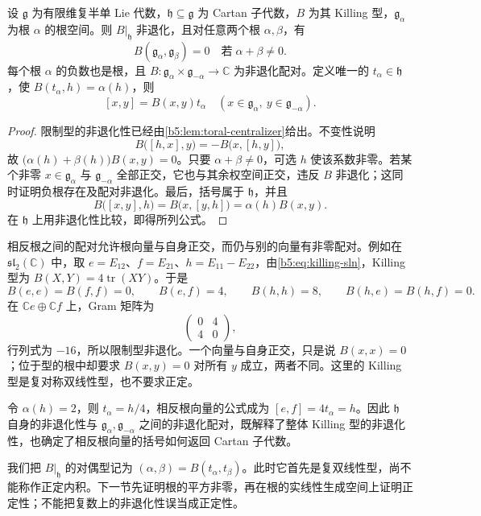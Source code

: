 \begin{proposition}\label{b5:prop:root-killing-pairing}
	设 \(\mathfrak g\) 为有限维复半单 Lie 代数，\(\mathfrak h\subseteq\mathfrak g\) 为 Cartan 子代数，\(B\) 为其 Killing 型，\(\mathfrak g_\alpha\) 为根 \(\alpha\) 的根空间。则 \(B|_{\mathfrak h}\) 非退化，且对任意两个根 \(\alpha,\beta\)，有
	\[
		B(\mathfrak g_\alpha,\mathfrak g_\beta)=0 \quad\text{若}\;\alpha+\beta\ne0.
	\]
	每个根 \(\alpha\) 的负数也是根，且 \(B:\mathfrak g_\alpha\times\mathfrak g_{-\alpha}\to\mathbb C\) 为非退化配对。定义唯一的 \(t_\alpha\in\mathfrak h\)，使 \(B(t_\alpha,h)=\alpha(h)\)，则
	\begin{equation}\label{b5:eq:opposite-root-bracket}
		[x,y]=B(x,y)t_\alpha \quad(x\in\mathfrak g_\alpha,\ y\in\mathfrak g_{-\alpha}).
	\end{equation}
\end{proposition}
\begin{proof}
	限制型的非退化性已经由\cref{b5:lem:toral-centralizer}给出。不变性说明
	\[
		B\bigl([h,x],y\bigr)=-B\bigl(x,[h,y]\bigr),
	\]
	故 \(\bigl(\alpha(h)+\beta(h)\bigr)B(x,y)=0\)。只要 \(\alpha+\beta\ne0\)，可选 \(h\) 使该系数非零。若某个非零 \(x\in\mathfrak g_\alpha\) 与 \(\mathfrak g_{-\alpha}\) 全部正交，它也与其余权空间正交，违反 \(B\) 非退化；这同时证明负根存在及配对非退化。最后，括号属于 \(\mathfrak h\)，并且
	\[
		B\bigl([x,y],h\bigr)=B\bigl(x,[y,h]\bigr) =\alpha(h)B(x,y).
	\]
	在 \(\mathfrak h\) 上用非退化性比较，即得所列公式。
\end{proof}

相反根之间的配对允许根向量与自身正交，而仍与别的向量有非零配对。例如在 \(\mathfrak{sl}_2(\mathbb C)\) 中，取 \(e=E_{12}\)、\(f=E_{21}\)、\(h=E_{11}-E_{22}\)，由\eqref{b5:eq:killing-sln}，Killing 型为 \(B(X,Y)=4\operatorname{tr}(XY)\)。于是
\[
	B(e,e)=B(f,f)=0,\qquad B(e,f)=4, \qquad B(h,h)=8,\qquad B(h,e)=B(h,f)=0.
\]
在 \(\mathbb Ce\oplus\mathbb Cf\) 上，Gram 矩阵为
\[
	\begin{pmatrix}0&4\\4&0\end{pmatrix},
\]
行列式为 \(-16\)，所以限制型非退化。一个向量与自身正交，只是说 \(B(x,x)=0\)；位于型的根中却要求 \(B(x,y)=0\) 对所有 \(y\) 成立，两者不同。这里的 Killing 型是复对称双线性型，也不要求正定。

\ProseParagraphBreak

令 \(\alpha(h)=2\)，则 \(t_\alpha=h/4\)，相反根向量的公式成为 \([e,f]=4t_\alpha=h\)。因此 \(\mathfrak h\) 自身的非退化性与 \(\mathfrak g_\alpha,\mathfrak g_{-\alpha}\) 之间的非退化配对，既解释了整体 Killing 型的非退化性，也确定了相反根向量的括号如何返回 Cartan 子代数。

\ProseParagraphBreak

我们把 \(B|_{\mathfrak h}\) 的对偶型记为 \((\alpha,\beta)=B(t_\alpha,t_\beta)\)。此时它首先是复双线性型，尚不能称作正定内积。下一节先证明根的平方非零，再在根的实线性生成空间上证明正定性；不能把复数上的非退化性误当成正定性。
